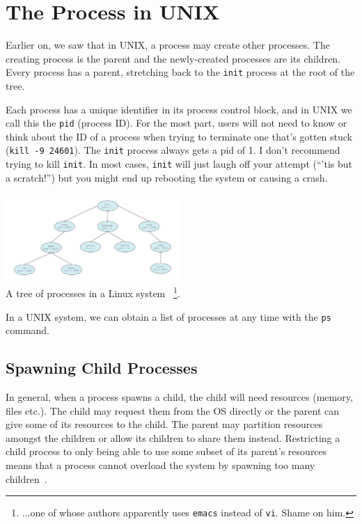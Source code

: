 




\section*{The Process in UNIX}

Earlier on, we saw that in UNIX, a process may create other processes. The creating process is the parent and the newly-created processes are its children. Every process has a parent, stretching back to the \texttt{init} process at the root of the tree.

Each process has a unique identifier in its process control block, and in UNIX we call this the \texttt{pid} (process ID). For the most part, users will not need to know or think about the ID of a process when trying to terminate one that's gotten stuck (\texttt{kill -9 24601}). The \texttt{init} process always gets a pid of 1. I don't recommend trying to kill \texttt{init}. In most cases, \texttt{init} will just laugh off your attempt (``'tis but a scratch!'') but you might end up rebooting the system or causing a crash.

\begin{center}
\includegraphics[width=0.5\textwidth]{images/linux-process-tree.png}\\
A tree of processes in a Linux system~\cite{osc} \footnote{...one of whose authors apparently uses \texttt{emacs} instead of \texttt{vi}. Shame on him.}.
\end{center}

In a UNIX system, we can obtain a list of processes at any time with the \texttt{ps} command.

\subsection*{Spawning Child Processes}

In general, when a process spawns a child, the child will need resources (memory, files etc.). The child may request them from the OS directly or the parent can give some of its resources to the child. The parent may partition resources amongst the children or allow its children to share them instead. Restricting a child process to only being able to use some subset of its parent's resources means that a process cannot overload the system by spawning too many children~\cite{osc}.

